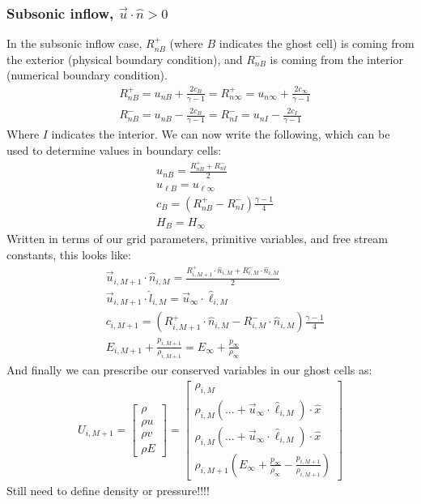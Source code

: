 \documentclass[11pt]{article}
\begin{document}
		\subsubsection*{Subsonic inflow, $\vec{u} \cdot \hat{n} > 0$}
		In the subsonic inflow case, $R_{nB}^+$ (where $B$ indicates the ghost cell) is coming from the exterior (physical boundary condition), and $R_{nB}^-$ is coming from the interior (numerical boundary condition). 
			\begin{align}
			&R_{nB}^+ = u_{nB} + \frac{2c_B}{\gamma - 1} = R_{n\infty}^+ = u_{n\infty} + \frac{2c_\infty}{\gamma - 1} \\
			&R_{nB}^- = u_{nB} - \frac{2c_B}{\gamma - 1} = R_{nI}^- = u_{nI} - \frac{2c_I}{\gamma - 1}
			\end{align}
		Where $I$ indicates the interior. We can now write the following, which can be used to determine values in boundary cells:
			\begin{align}
			&u_{nB} = \frac{R_{nB}^+ + R_{nI}^-}{2} \\
			&u_{\ell B} = u_{\ell\infty} \\
			&c_B = (R_{nB}^+ - R_{nI}^-) \frac{\gamma - 1}{4} \\
			&H_{B} = H_\infty 
			\end{align}
		Written in terms of our grid parameters, primitive variables, and free stream constants, this looks like: 
			\begin{align}
			&\vec{u}_{i,M+1} \cdot \hat{n}_{i,M} = \frac{R_{i,M+1}^+ \cdot \hat{n}_{i,M} + R_{i,M}^- \cdot \hat{n}_{i,M}}{2} \\
			&\vec{u}_{i,M+1} \cdot \hat{l}_{i,M} = \vec{u}_\infty \cdot \hat{\ell}_{i,M} \\
			&c_{i,M+1} = (R_{i,M+1}^+ \cdot \hat{n}_{i,M} - R_{i,M}^- \cdot \hat{n}_{i,M}) \frac{\gamma - 1}{4} \\
			&E_{i,M+1} + \frac{p_{i,M+1}}{\rho_{i,M+1}}= E_\infty + \frac{p_\infty}{\rho_\infty} 
			\end{align}
		And finally we can prescribe our conserved variables in our ghost cells as:
			\begin{align}
			U_{i,M+1} = \begin{bmatrix}
			\rho \\ \rho u \\ \rho v \\ \rho E
			\end{bmatrix} = 
			\begin{bmatrix}
			\rho_{i,M} \\
			\rho_{i,M}(...  + \vec{u}_\infty \cdot \hat{\ell}_{i,M}) \cdot \hat{x} \\
			\rho_{i,M}(...  + \vec{u}_\infty \cdot \hat{\ell}_{i,M}) \cdot \hat{x} \\
			\rho_{i,M+1} \left( E_\infty + \frac{p_\infty}{\rho_\infty} - \frac{p_{i,M+1}}{\rho_{i,M+1}} \right)
			\end{bmatrix}
			\end{align}
		{\color{red} Still need to define density or pressure!!!!}
		
\end{document}
